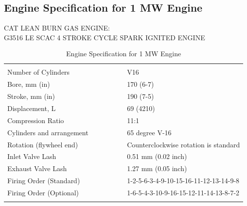 \documentclass[12pt]{article}
\begin{document}
    \subsection*{Engine Specification for 1 MW Engine}
    CAT LEAN BURN GAS ENGINE: \\
    G3516 LE SCAC 4 STROKE CYCLE SPARK IGNITED ENGINE  
    \begin{table}[ht]
      \centering
      \begin{adjustbox}{width=\textwidth}
      \begin{tabularx}{\linewidth}{p{0.5\linewidth} p{0.5\linewidth}}
        \hline 
        \\
        Number of Cylinders & V16 \\
        Bore, mm (in) & 170 (6-7) \\
        Stroke, mm (in) & 190 (7-5) \\
        Displacement, L & 69 (4210) \\
        Compression Ratio & 11:1 \\
        Cylinders and arrangement & 65 degree V-16 \\
        Rotation (flywheel end) & Counterclockwise rotation is standard \\
        Inlet Valve Lash & 0.51 mm (0.02 inch) \\
        Exhaust Valve Lash & 1.27 mm (0.05 inch) \\
        Firing Order (Standard) & 1-2-5-6-3-4-9-10-15-16-11-12-13-14-9-8 \\
        Firing Order (Optional) & 1-6-5-4-3-10-9-16-15-12-11-14-13-8-7-2 \\
        \\
        \hline
      \end{tabularx}
      \end{adjustbox}
      \caption{Engine Specification for 1 MW Engine}
      \label{tab:Roof}
      \end{table}
\end{document}
